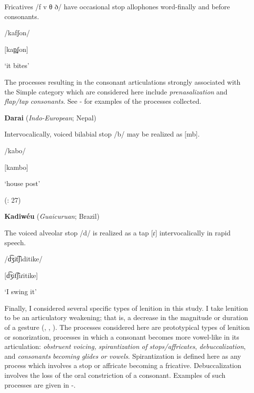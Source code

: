 Fricatives /f v θ ð/ have occasional stop allophones word-finally and before consonants.

/kafʃon/

[kap̪ʃon]

\glt ‘it bites’

\citep[16]{Newmark1957}

\z

  The processes resulting in the consonant articulations strongly associated with the Simple category which are considered here include \textit{prenasalization} and \textit{flap/tap} \textit{consonants}. See - for examples of the processes collected.

\ea\label{ex:(7.12)}
  \textbf{Darai} (\textit{Indo-European}; Nepal)

Intervocalically, voiced bilabial stop /b/ may be realized as [mb].

/kabo/

[kambo]

\glt ‘house post’

(\citealt{KotapishKotapish1973}: 27)
\z

\ea\label{ex:(7.13)}
  \textbf{Kadiwéu} (\textit{Guaicuruan}; Brazil)

The voiced alveolar stop /d/ is realized as a tap [ɾ] intervocalically in rapid speech.

/d͡ʒit͡ʃiditike/

[d͡ʒit͡ʃiɾitike]

\glt ‘I swing it’

\citep[16]{Sandalo1997}

\z

  Finally, I considered several specific types of lenition in this study. I take lenition to be an articulatory weakening; that is, a decrease in the magnitude or duration of a gesture (\citealt{BrowmanGoldstein1992b}, \citealt{MowreyPagliuca1995}, \citealt{BybeeEasterday2019}). The processes considered here are prototypical types of lenition or sonorization, processes in which a consonant becomes more vowel-like in its articulation: \textit{obstruent} \textit{voicing,} \textit{spirantization} \textit{of} \textit{stops/affricates}, \textit{debuccalization}, and \textit{consonants} \textit{becoming} \textit{glides} \textit{or} \textit{vowels}. Spirantization is defined here as any process which involves a stop or affricate becoming a fricative. Debuccalization involves the loss of the oral constriction of a consonant. Examples of such processes are given in -.

